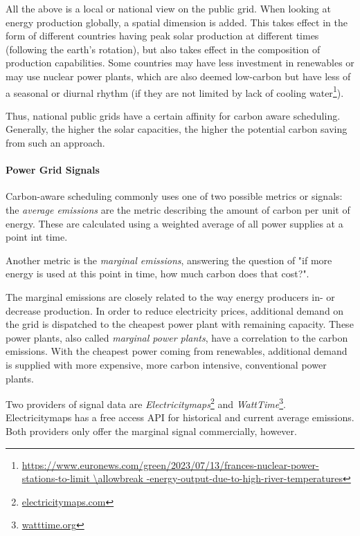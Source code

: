 All the above is a local or national view on the public grid. 
When looking at energy production globally, a spatial dimension is added. 
This takes effect in the form of different countries having peak solar production at different times (following the earth's rotation), but also takes effect in the composition of production capabilities.
Some countries may have less investment in renewables or may use nuclear power plants, which are also deemed low-carbon but have less of a seasonal or diurnal rhythm (if they are not limited by lack of cooling water\footnote{\url{https://www.euronews.com/green/2023/07/13/frances-nuclear-power-stations-to-limit \allowbreak -energy-output-due-to-high-river-temperatures}}).

Thus, national public grids have a certain affinity for carbon aware scheduling\cite{wiesner_lets_2021}. Generally, the higher the solar capacities, the higher the potential carbon saving from such an approach. 

\paragraph{Power Grid Signals}
Carbon-aware scheduling commonly uses one of two possible metrics or signals: the \emph{average emissions} are the metric describing the amount of carbon per unit of energy. These are calculated using a weighted average of all power supplies at a point int time.

Another metric is the \emph{marginal emissions}, answering the question of "if more energy is used at this point in time, how much carbon does that cost?". 

The marginal emissions are closely related to the way energy producers in- or decrease production.
In order to reduce electricity prices, additional demand on the grid is dispatched to the cheapest power plant with remaining capacity. 
These power plants, also called \emph{marginal power plants}, have a correlation to the carbon emissions.
With the cheapest power coming from renewables, additional demand is supplied with more expensive, more carbon intensive, conventional power plants.

Two providers of signal data are \emph{Electricitymaps}\footnote{\url{electricitymaps.com}} and \emph{WattTime}\footnote{\url{watttime.org}}.
Electricitymaps has a free access API for historical and current average emissions. Both providers only offer the marginal signal commercially, however. 

